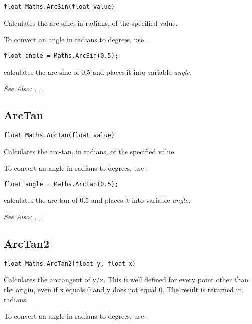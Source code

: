 \begin{verbatim}
float Maths.ArcSin(float value)
\end{verbatim}
Calculates the arc-sine, in radians, of the specified value.

To convert an angle in radians to degrees, use .

\begin{verbatim}
float angle = Maths.ArcSin(0.5);
\end{verbatim}
calculates the arc-sine of 0.5 and places it into variable \it{angle}.

\it{See Also:} ,
,


\subsection{ArcTan}\label{Maths.ArcTan}%

\begin{verbatim}
float Maths.ArcTan(float value)
\end{verbatim}
Calculates the arc-tan, in radians, of the specified value.

To convert an angle in radians to degrees, use .

\begin{verbatim}
float angle = Maths.ArcTan(0.5);
\end{verbatim}
calculates the arc-tan of 0.5 and places it into variable \it{angle}.

\it{See Also:} ,
,


\subsection{ArcTan2}\label{Maths.ArcTan2}%

\begin{verbatim}
float Maths.ArcTan2(float y, float x)
\end{verbatim}
Calculates the arctangent of y/x. This is well defined for every point other than the origin,
even if x equals 0 and y does not equal 0. The result is returned in radians.

To convert an angle in radians to degrees, use .

